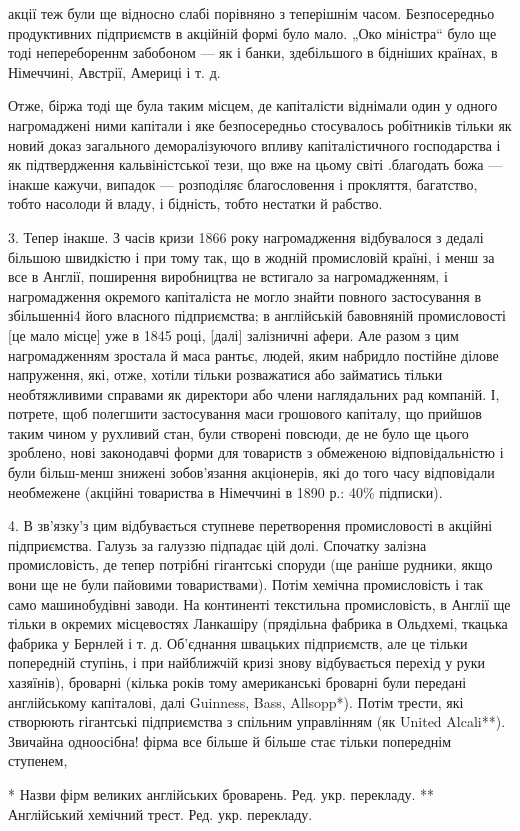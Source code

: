 \parcont{}  %
акції теж були ще відносно слабі порівняно з теперішнім часом. Безпосередньо продуктивних підприємств в акційній формі було
мало. „Око міністра“ було ще тоді неперебореннм забобоном — як і банки, здебільшого в бідніших країнах, в Німеччині,
Австрії, Америці і т. д.

Отже, біржа тоді ще була таким місцем, де капіталісти віднімали один у одного нагромаджені ними
капітали і яке безпосередньо стосувалось робітників тільки як новий доказ загального деморалізуючого впливу капіталістичного
господарства і як підтвердження кальвіністської тези, що вже на цьому світі .благодать божа — інакше кажучи, випадок —
розподіляє благословення і прокляття, багатство, тобто насолоди й владу, і бідність, тобто нестатки й рабство.

3. Тепер інакше. З часів кризи 1866 року нагромадження відбувалося з дедалі більшою швидкістю і при тому так, що в жодній промисловій
країні, і менш за все в Англії, поширення виробництва не встигало за нагромадженням, і нагромадження окремого капіталіста не
могло знайти повного застосування в збільшенні4 його власного підприємства; в англійській бавовняній промисловості [це мало
місце] уже в 1845 році, [далі] залізничні афери. Але разом з цим нагромадженням зростала й маса рантьє, людей, яким набридло
постійне ділове напруження, які, отже, хотіли тільки розважатися або займатись тільки необтяжливими справами як директори
або члени наглядальних рад компаній. І, потрете, щоб полегшити застосування маси грошового капіталу, що прийшов таким чином
у рухливий стан, були створені повсюди, де не було ще цього зроблено, нові законодавчі форми для товариств з обмеженою
відповідальністю і були більш-менш знижені зобов’язання акціонерів, які до того часу відповідали необмежене (акційні
товариства в Німеччині в 1890 р.: 40\% підписки).

4. В зв’язку'з цим відбувається ступневе перетворення промисловості в акційні підприємства. Галузь за галуззю підпадає цій
долі. Спочатку залізна промисловість, де тепер потрібні гігантські споруди (ще раніше рудники, якщо вони ще не були пайовими
товариствами). Потім хемічна промисловість і так само машинобудівні заводи. На континенті текстильна промисловість, в Англії
ще тільки в окремих місцевостях Ланкашіру (прядільна фабрика в Ольдхемі, ткацька фабрика у Бернлей і т. д. Об’єднання
швацьких підприємств, але це тільки попередній ступінь, і при найближчій кризі знову відбувається перехід у руки хазяїнів),
броварні (кілька років тому американські броварні були передані англійському капіталові, далі Guinness, Bass,  Allsopp*).
Потім трести, які створюють гігантські підприємства з спільним управлінням (як United Alcali**). Звичайна одноосібна!  фірма
все більше й більше стає тільки попереднім ступенем,

* Назви фірм великих англійських броварень. Ред. укр. перекладу.
** Англійський хемічний трест. Ред. укр. перекладу.
\parbreak{}  %
